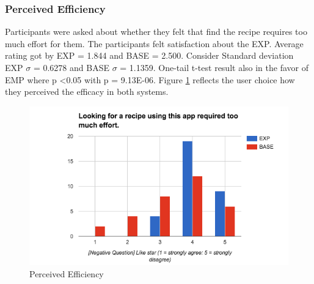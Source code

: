 \subsubsection{Perceived Efficiency}
Participants were asked about whether they felt that find the recipe requires too much effort for them. The participants felt satisfaction about the EXP. Average rating got by EXP = 1.844 and BASE = 2.500. Consider Standard deviation EXP ${\sigma}$ = 0.6278 and BASE ${\sigma}$ = 1.1359. One-tail t-test result also in the favor of EMP where p <0.05 with p = 9.13E-06. Figure \ref{fig:ch5_stat_effiiciency} reflects the user choice how they perceived the efficacy in both systems.
\begin{figure}[h]
	\centering
	\includegraphics[width= 1\linewidth]{figures/ch5_stat_effiiciency}
	\caption{Perceived Efficiency}
	\label{fig:ch5_stat_effiiciency}
\end{figure}
\newpage

